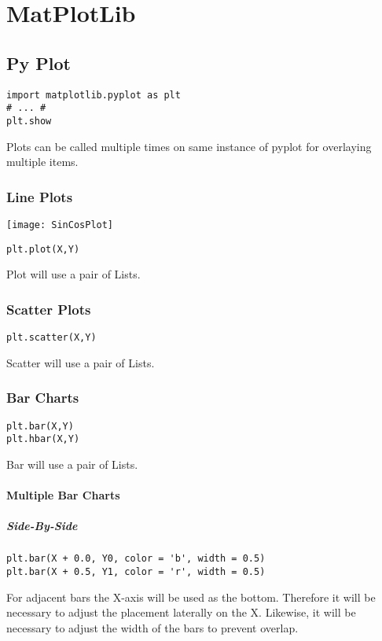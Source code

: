 \chapter{MatPlotLib}
\label{ch:MatPlotLib}

\section{Py Plot}
\begin{verbatim}
import matplotlib.pyplot as plt
# ... #
plt.show
\end{verbatim}
Plots can be called multiple times on same instance of 
pyplot for overlaying multiple items.

\subsection{Line Plots}
\texttt{[image: SinCosPlot]}
\begin{verbatim}
plt.plot(X,Y)
\end{verbatim}
Plot will use a pair of Lists. 

\subsection{Scatter Plots}
\begin{verbatim}
plt.scatter(X,Y)
\end{verbatim}
Scatter will use a pair of Lists. 

\subsection{Bar Charts}
\begin{verbatim}
plt.bar(X,Y)
plt.hbar(X,Y)
\end{verbatim}
Bar will use a pair of Lists. 

\subsubsection{Multiple Bar Charts}
\paragraph{Side-By-Side}
\begin{verbatim}
plt.bar(X + 0.0, Y0, color = 'b', width = 0.5)
plt.bar(X + 0.5, Y1, color = 'r', width = 0.5)
\end{verbatim}
For adjacent bars the X-axis will be used as the bottom.
Therefore it will be necessary to adjust the placement laterally on the X.
Likewise, it will be necessary to adjust the width of the bars to prevent overlap.

